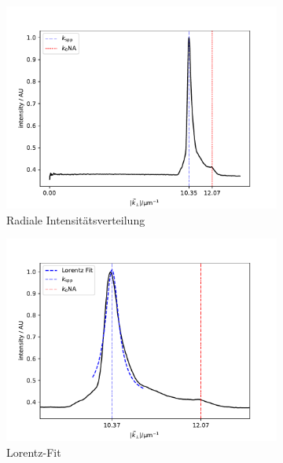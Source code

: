 \documentclass[titlepage]{article}
\begin{document}
	\begin{figure}
		\label{fig:example_measure}
		\centering
		\begin{subfigure}[b]{0.5\textwidth}
				\centering
			\includegraphics[width=\textwidth]{figures/example_radial.pdf}
			\caption{Radiale Intensitätsverteilung}
			\label{fig:radial_profile}			
		\end{subfigure}
		\hfill
		\begin{subfigure}[b]{0.49\textwidth}
			\centering
			\includegraphics[width=\textwidth]{figures/lorenz_profile}
			\caption{Lorentz-Fit}
			\label{fig:lorenz_profile}			
		\end{subfigure}
		\begin{subfigure}[b]{0.7\textwidth}

\end{subfigure}
\end{figure}
\end{document}
